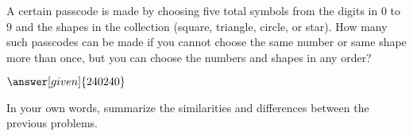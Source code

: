 \documentclass[nooutcomes]{ximera}
\begin{document}
\begin{problem}
A certain passcode is made by choosing five total symbols from the digits in $0$ to $9$ and the shapes in the collection (square, triangle, circle, or star).  How many such passcodes can be made if you cannot choose the same number or same shape more than once, but you can choose the numbers and shapes in any order?
\begin{prompt}
	$\answer[given]{240240}$ %
\end{prompt}
\end{problem}


\begin{problem}
In your own words, summarize the similarities and differences between the previous problems.

\begin{freeResponse}
\end{freeResponse}
\end{problem}



%
%
\end{document}
